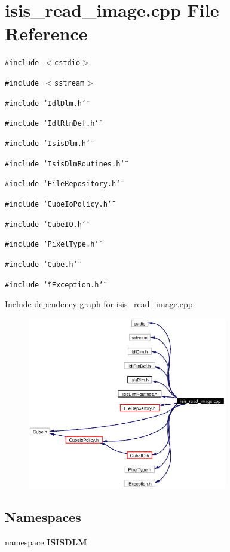 \section{isis\_\-read\_\-image.cpp File Reference}
\label{isis__read__image_8cpp}
{\tt \#include $<$cstdio$>$}\par
{\tt \#include $<$sstream$>$}\par
{\tt \#include \char`\"{}Idl\-Dlm.h\char`\"{}}\par
{\tt \#include \char`\"{}Idl\-Rtn\-Def.h\char`\"{}}\par
{\tt \#include \char`\"{}Isis\-Dlm.h\char`\"{}}\par
{\tt \#include \char`\"{}Isis\-Dlm\-Routines.h\char`\"{}}\par
{\tt \#include \char`\"{}File\-Repository.h\char`\"{}}\par
{\tt \#include \char`\"{}Cube\-Io\-Policy.h\char`\"{}}\par
{\tt \#include \char`\"{}Cube\-IO.h\char`\"{}}\par
{\tt \#include \char`\"{}Pixel\-Type.h\char`\"{}}\par
{\tt \#include \char`\"{}Cube.h\char`\"{}}\par
{\tt \#include \char`\"{}i\-Exception.h\char`\"{}}\par


Include dependency graph for isis\_\-read\_\-image.cpp:\begin{figure}[H]
\begin{center}
\leavevmode
\includegraphics[width=247pt]{isis__read__image_8cpp__incl}
\end{center}
\end{figure}
\subsection*{Namespaces}
\begin{CompactItemize}
\item 
namespace {\bf ISISDLM}
\end{CompactItemize}
